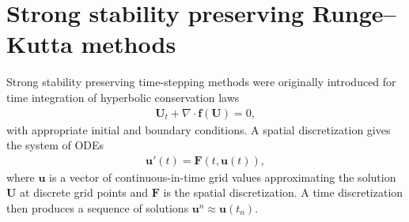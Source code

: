 \section{Strong stability preserving Runge--Kutta methods}\label{sec:SSP}
Strong stability preserving time-stepping methods were originally introduced
for time integration of hyperbolic conservation laws
\cite{Shu/Osher:1988} 
\begin{align}\label{eq:ode_system}
	\bm{U}_t + \nabla \cdot \bm{f}(\bm{U}) = 0,   
\end{align}
with appropriate initial and boundary conditions.
A spatial discretization gives the system of ODEs
\begin{align*}
    \bm{u}'(t) = \bm{F}(t,\bm{u}(t)),
\end{align*}
where $\bm{u}$ is a vector of continuous-in-time grid values approximating 
the solution $\bm{U}$ at discrete grid points and $\bm{F}$ is the spatial 
discretization. 
A time discretization then produces a sequence of solutions
$\bm{u}^{n} \approx \bm{u}(t_n)$.

